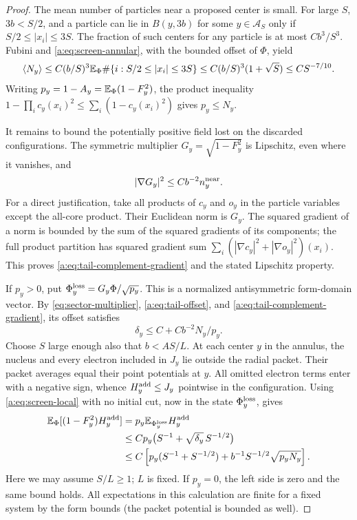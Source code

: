 \begin{proof}
The mean number of particles near a proposed center is small.  For
large $S$, $3b<S/2$, and a particle can lie in $B(y,3b)$ for some
$y\in\mathcal A_S$ only if $S/2\le|x_i|\le3S$.  The fraction of such
centers for any particle is at most $Cb^3/S^3$.  Fubini and
\eqref{a:eq:screen-annular}, with the bounded offset of $\Phi$, yield
\begin{equation}\label{a:eq:tail-insertion-overlap}
 \langle N_y\rangle
 \le C(b/S)^3\mathbb E_\Phi\#\{i:S/2\le|x_i|\le3S\}
 \le C(b/S)^3(1+\sqrt S)
 \le CS^{-7/10}.
\end{equation}
Writing $p_y=1-A_y=\mathbb E_\Phi(1-F_y^2)$, the product inequality
$1-\prod_i c_y(x_i)^2\le\sum_i(1-c_y(x_i)^2)$ gives $p_y\le N_y$.

It remains to bound the potentially positive field lost on the
discarded configurations.  The symmetric multiplier
$G_y=\sqrt{1-F_y^2}$ is Lipschitz, even where it vanishes, and
\begin{equation}\label{a:eq:tail-complement-gradient}
 |\nabla G_y|^2\le Cb^{-2}n_y^{\rm near}.
\end{equation}
For a direct justification, take all products of $c_y$ and $o_y$ in
the particle variables except the all-core product.  Their Euclidean
norm is $G_y$.  The squared gradient of a norm is bounded by the sum
of the squared gradients of its components; the full product partition
has squared gradient sum
$\sum_i(|\nabla c_y|^2+|\nabla o_y|^2)(x_i)$.
This proves \eqref{a:eq:tail-complement-gradient} and the stated
Lipschitz property.

If $p_y>0$, put $\Phi_y^{\rm loss}=G_y\Phi/\sqrt{p_y}$.  This is a
normalized antisymmetric form-domain vector.  By
\eqref{eq:sector-multiplier}, \eqref{a:eq:tail-offset}, and
\eqref{a:eq:tail-complement-gradient}, its offset satisfies
\begin{equation}\label{a:eq:tail-complement-offset}
 \delta_y\le C+Cb^{-2}N_y/p_y.
\end{equation}
Choose $S$ large enough also that $b<A S/L$.  At each center $y$ in
the annulus, the nucleus and every electron included in $J_y$ lie
outside the radial packet.  Their packet averages equal their point
potentials at $y$.  All omitted electron terms enter with a negative
sign, whence $H_y^{\rm add}\le J_y$ pointwise in the configuration.
Using \eqref{a:eq:screen-local} with no initial cut, now in the state
$\Phi_y^{\rm loss}$, gives
\begin{align}
 \mathbb E_\Phi[(1-F_y^2)H_y^{\rm add}]
 &=p_y\mathbb E_{\Phi_y^{\rm loss}}H_y^{\rm add}\notag\\
 &\le Cp_y\big(S^{-1}+\sqrt{\delta_y}\,S^{-1/2}\big)\notag\\
 &\le C\left[
 p_y(S^{-1}+S^{-1/2})
 +b^{-1}S^{-1/2}\sqrt{p_yN_y}\right].
 \label{a:eq:tail-loss-bound}
\end{align}
Here we may assume $S/L\ge1$; $L$ is fixed.  If $p_y=0$, the left
side is zero and the same bound holds.  All expectations in this
calculation are finite for a fixed system by the form bounds (the
packet potential is bounded as well).


\end{proof}
